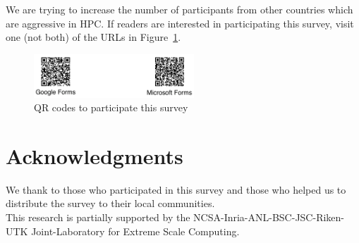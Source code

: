 \documentclass[sigconf,nonacm]{acmart}
\begin{document}
We are trying to increase the number of participants from other 
countries which are aggressive in HPC.  
If readers are interested in participating this survey,
visit one (not both) of the URLs in
Figure~\ref{fig:qrcodes}.  

\begin{figure}[htb]
\begin{center}
\includegraphics[width=6cm]{figs/QR-codes.pdf}
\vspace{-3mm}
\caption{QR codes to participate this survey}
\label{fig:qrcodes}
\end{center}
\vspace{-5mm}
\end{figure}

\section*{Acknowledgments}
{\small
We thank to those who participated in this survey and those who
helped us to distribute the survey to their local communities.\\
This research is partially supported by the
NCSA-Inria-ANL-BSC-JSC-Riken-UTK Joint-Laboratory for Extreme Scale
Computing\cite{JLESC}.
}


\end{document}
